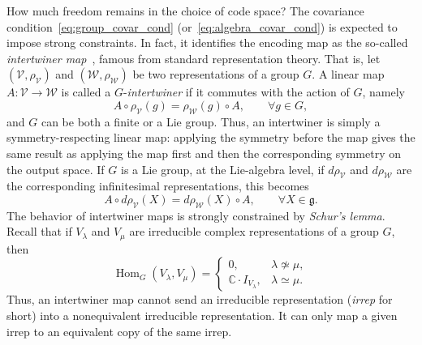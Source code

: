\documentclass[10pt,twocolumn,superscriptaddress,aps,amsmath,amssymb,citeautoscript,floatfix,prx,longbibliography]{revtex4-2}
\newcounter{alg}
\theoremstyle{plain}
\theoremstyle{plain}
\theoremstyle{plain}
\theoremstyle{plain}
\theoremstyle{plain}
\theoremstyle{plain}
\begin{document}

How much freedom remains in the choice of code space? The covariance condition~\eqref{eq:group_covar_cond} (or~\eqref{eq:algebra_covar_cond}) is expected to impose strong constraints. In fact, it identifies the encoding map as the so-called \textit{intertwiner map}~\cite{FultonHarris1991}, famous from standard representation theory. That is, 
let \((\mathcal V,\rho_{\mathcal V})\) and \((\mathcal W,\rho_{\mathcal W})\) be two representations of a group \(G\). A linear map
\(A:\mathcal V\to\mathcal W\)
is called a \(G\)-\textit{intertwiner} if it commutes with the action of \(G\), namely
\begin{equation}\label{eq:intertwiner_def}
    A\circ\rho_{\mathcal V}(g)
    =
    \rho_{\mathcal W}(g)\circ A,
    \qquad
    \forall g\in G,
\end{equation}
and $G$ can be both a finite or a Lie group.
Thus, an intertwiner is simply a symmetry-respecting linear map: applying the symmetry before the map gives the same result as applying the map first and then the corresponding symmetry on the output space. 
If $G$ is a Lie group, at the Lie-algebra level, if \(d\rho_{\mathcal V}\) and \(d\rho_{\mathcal W}\)
are the corresponding infinitesimal representations, this becomes
\[
    A\circ d\rho_{\mathcal V}(X)
    =
    d\rho_{\mathcal W}(X) \circ A,
    \qquad
    \forall X\in\mathfrak g.
\]
The behavior of intertwiner maps is strongly constrained by \textit{Schur's lemma}. Recall that if \(V_\lambda\) and \(V_\mu\) are irreducible complex representations of a group \(G\), then
\[
    \operatorname{Hom}_G(V_\lambda,V_\mu)
    =
    \begin{cases}
        0, & \lambda\not\simeq \mu,\\
        \mathbb C\cdot I_{V_\lambda}, & \lambda\simeq \mu.
    \end{cases}
\]
Thus, an intertwiner map cannot send an irreducible representation (\textit{irrep} for short) into a nonequivalent irreducible representation. It can only map a given irrep to an equivalent copy of the same irrep.
\end{document}
